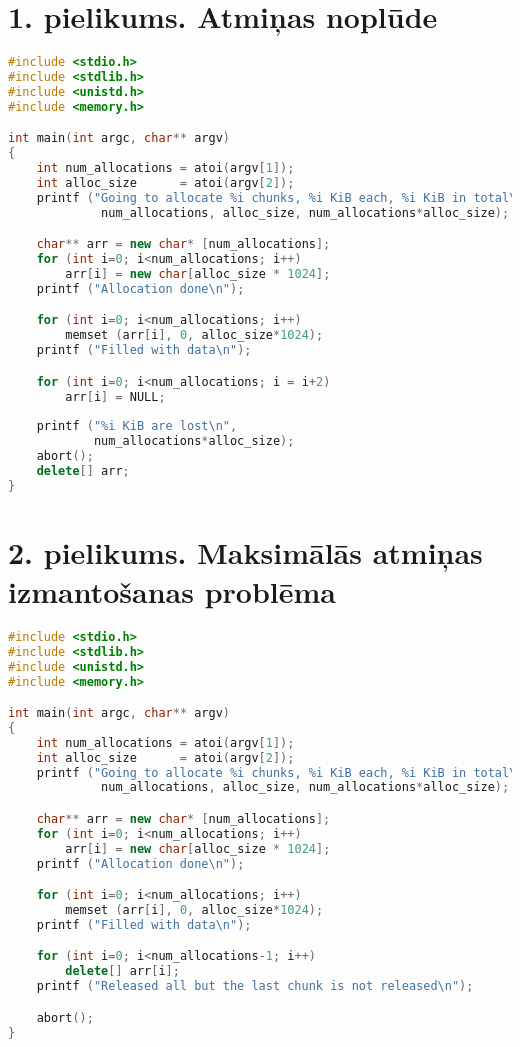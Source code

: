﻿

\chapter{1. pielikums. Atmiņas noplūde}

    
   
\begin{lstlisting}[language=C++]
#include <stdio.h>
#include <stdlib.h>
#include <unistd.h>
#include <memory.h>

int main(int argc, char** argv)
{
	int num_allocations = atoi(argv[1]);
	int alloc_size      = atoi(argv[2]);
	printf ("Going to allocate %i chunks, %i KiB each, %i KiB in total\n",
	         num_allocations, alloc_size, num_allocations*alloc_size);

	char** arr = new char* [num_allocations];
	for (int i=0; i<num_allocations; i++)
		arr[i] = new char[alloc_size * 1024];
	printf ("Allocation done\n");

	for (int i=0; i<num_allocations; i++)
		memset (arr[i], 0, alloc_size*1024);
	printf ("Filled with data\n");

	for (int i=0; i<num_allocations; i = i+2)
		arr[i] = NULL;
        
	printf ("%i KiB are lost\n", 
			num_allocations*alloc_size);
	abort();
	delete[] arr;
} 
\end{lstlisting}

\newpage
\chapter{2. pielikums. Maksimālās atmiņas izmantošanas problēma}


\begin{lstlisting}[language=C++]
#include <stdio.h>
#include <stdlib.h>
#include <unistd.h>
#include <memory.h>

int main(int argc, char** argv)
{
	int num_allocations = atoi(argv[1]);
	int alloc_size      = atoi(argv[2]);
	printf ("Going to allocate %i chunks, %i KiB each, %i KiB in total\n",
	         num_allocations, alloc_size, num_allocations*alloc_size);

	char** arr = new char* [num_allocations];
	for (int i=0; i<num_allocations; i++)
		arr[i] = new char[alloc_size * 1024];
	printf ("Allocation done\n");

	for (int i=0; i<num_allocations; i++)
		memset (arr[i], 0, alloc_size*1024);
	printf ("Filled with data\n");

	for (int i=0; i<num_allocations-1; i++)
		delete[] arr[i];
	printf ("Released all but the last chunk is not released\n");

	abort();
} 
\end{lstlisting}

